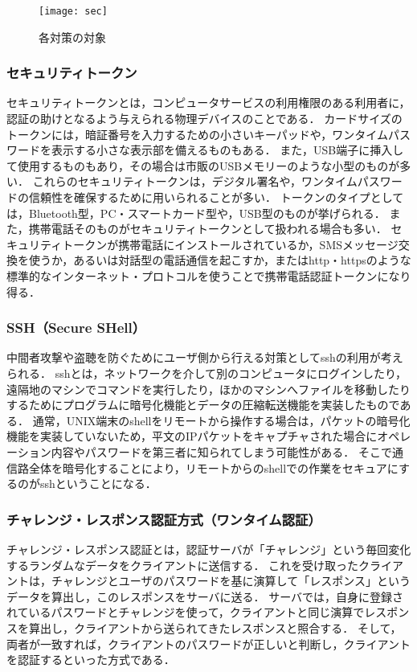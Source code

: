 \begin{figure}[h]
 \hspace*{\fill}
 \texttt{[image: sec]}
 \hspace*{\fill}
 \caption{各対策の対象}
\end{figure}

\subsubsection{セキュリティトークン}
セキュリティトークンとは，コンピュータサービスの利用権限のある利用者に，認証の助けとなるよう与えられる物理デバイスのことである．
カードサイズのトークンには，暗証番号を入力するための小さいキーパッドや，ワンタイムパスワードを表示する小さな表示部を備えるものもある．
また，USB端子に挿入して使用するものもあり，その場合は市販のUSBメモリーのような小型のものが多い．
これらのセキュリティトークンは，デジタル署名や，ワンタイムパスワードの信頼性を確保するために用いられることが多い．
トークンのタイプとしては，Bluetooth型，PC・スマートカード型や，USB型のものが挙げられる．
また，携帯電話そのものがセキュリティトークンとして扱われる場合も多い．
セキュリティトークンが携帯電話にインストールされているか，SMSメッセージ交換を使うか，あるいは対話型の電話通信を起こすか，またはhttp・httpsのような標準的なインターネット・プロトコルを使うことで携帯電話認証トークンになり得る．

\subsubsection{SSH（Secure SHell）}
中間者攻撃や盗聴を防ぐためにユーザ側から行える対策としてsshの利用が考えられる．
sshとは，ネットワークを介して別のコンピュータにログインしたり，遠隔地のマシンでコマンドを実行したり，ほかのマシンへファイルを移動したりするためにプログラムに暗号化機能とデータの圧縮転送機能を実装したものである．
通常，UNIX端末のshellをリモートから操作する場合は，パケットの暗号化機能を実装していないため，平文のIPパケットをキャプチャされた場合にオペレーション内容やパスワードを第三者に知られてしまう可能性がある．
そこで通信路全体を暗号化することにより，リモートからのshellでの作業をセキュアにするのがsshということになる．

\subsubsection{チャレンジ・レスポンス認証方式（ワンタイム認証）}
チャレンジ・レスポンス認証とは，認証サーバが「チャレンジ」という毎回変化するランダムなデータをクライアントに送信する．
これを受け取ったクライアントは，チャレンジとユーザのパスワードを基に演算して「レスポンス」というデータを算出し，このレスポンスをサーバに送る．
サーバでは，自身に登録されているパスワードとチャレンジを使って，クライアントと同じ演算でレスポンスを算出し，クライアントから送られてきたレスポンスと照合する．
そして，両者が一致すれば，クライアントのパスワードが正しいと判断し，クライアントを認証するといった方式である．

